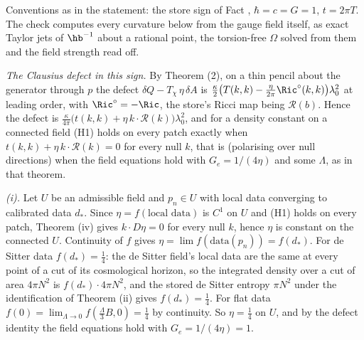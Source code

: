 Conventions as in the statement: the store sign of Fact , $\hbar = c = G = 1$, $t = 2\pi T$. The check computes every curvature below from the gauge field itself, as exact Taylor jets of $\hb^{-1}$ about a rational point, the torsion-free $\Omega$ solved from them and the field strength read off.

\emph{The Clausius defect in this sign.} By Theorem (2), on a thin pencil about the generator through $p$ the defect $\delta Q - T_{\chi}\,\eta\,\delta A$ is $\tfrac{\kappa}{2}\bigl(T(k,k) - \tfrac{\eta}{2\pi}\Ric^{\circ}(k,k)\bigr)\lambda_{0}^{2}$ at leading order, with $\Ric^{\circ} = -\Ric$, the store's Ricci map being $\mathcal{R}(b)$. Hence the defect is $\tfrac{\kappa}{4\pi}\bigl(t(k,k) + \eta\,k\cdot\mathcal{R}(k)\bigr)\lambda_{0}^{2}$, and for a density constant on a connected field (H1) holds on every patch exactly when $t(k,k) + \eta\,k\cdot\mathcal{R}(k) = 0$ for every null $k$, that is (polarising over null directions) when the field equations hold with $G_{e} = 1/(4\eta)$ and some $\Lambda$, as in that theorem.

\emph{(i).} Let $U$ be an admissible field and $p_{n} \in U$ with local data converging to calibrated data $d_{*}$. Since $\eta = f(\text{local data})$ is $C^{1}$ on $U$ and (H1) holds on every patch, Theorem (iv) gives $k\cdot D\eta = 0$ for every null $k$, hence $\eta$ is constant on the connected $U$. Continuity of $f$ gives $\eta = \lim f(\text{data}(p_{n})) = f(d_{*})$. For de Sitter data $f(d_{*}) = \tfrac14$: the de Sitter field's local data are the same at every point of a cut of its cosmological horizon, so the integrated density over a cut of area $4\pi N^{2}$ is $f(d_{*})\cdot 4\pi N^{2}$, and the stored de Sitter entropy $\pi N^{2}$ under the identification of Theorem (ii) gives $f(d_{*}) = \tfrac14$. For flat data $f(0) = \lim_{\Lambda\to 0} f(\tfrac{\Lambda}{3}B, 0) = \tfrac14$ by continuity. So $\eta = \tfrac14$ on $U$, and by the defect identity the field equations hold with $G_{e} = 1/(4\eta) = 1$.

